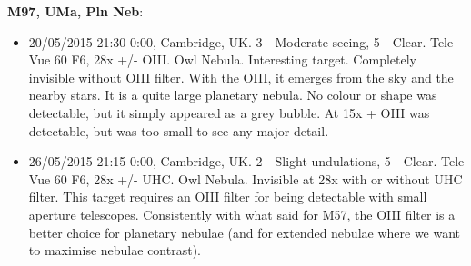 {\bf M97, UMa, Pln Neb}:
\begin{itemize}
\item 20/05/2015 21:30-0:00, Cambridge, UK. 3 - Moderate seeing, 5 - Clear. Tele Vue 60 F6, 28x +/- OIII. Owl Nebula. Interesting target. Completely invisible without OIII filter. With the OIII, it emerges from the sky and the nearby stars. It is a quite large planetary nebula. No colour or shape was detectable, but it simply appeared as a grey bubble. At 15x + OIII was detectable, but was too small to see any major detail.
\item 26/05/2015 21:15-0:00, Cambridge, UK. 2 - Slight undulations, 5 - Clear. Tele Vue 60 F6, 28x +/- UHC. Owl Nebula. Invisible at 28x with or without UHC filter. This target requires an OIII filter for being detectable with small aperture telescopes. Consistently with what said for M57, the OIII filter is a better choice for planetary nebulae (and for extended nebulae where we want to maximise nebulae contrast).
\end{itemize}
